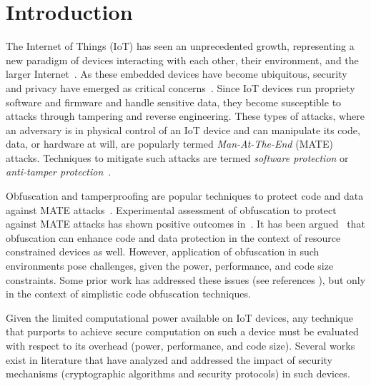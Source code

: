 \section{Introduction}
The Internet of Things (IoT) has seen an unprecedented growth, representing a new paradigm of devices interacting with each other, their environment, and the larger Internet~\cite{ATZORI20102787}. As these embedded devices have become ubiquitous, security and privacy have emerged as critical concerns~\cite{weber2010internet,7054433}. Since IoT devices run propriety software and firmware and handle sensitive data, they become susceptible to attacks through tampering and reverse engineering. These types of attacks, where an adversary is in physical control of an IoT device and can manipulate its code, data, or hardware at will, are popularly termed {\em Man-At-The-End} (MATE) attacks. Techniques to mitigate such attacks are termed {\em software protection} or {\em anti-tamper protection}~\cite{falcarin2011guest}.

Obfuscation and tamperproofing are popular techniques to protect code and data against MATE attacks~\cite{collberg_surreptitious_2010}. Experimental assessment of obfuscation to protect against MATE attacks has shown positive outcomes in~\cite{5090041,7781792}. It has been argued~\cite{Hosseinzadeh2015} that obfuscation can enhance code and data protection in the context of resource constrained devices as well. However, application of obfuscation in such environments pose challenges, given the power, performance, and code size constraints. Some prior work has addressed these issues (see references \cite{6976079,dhukovic2015load,raj2017modelling}), but only in the context of simplistic code obfuscation techniques.

Given the limited computational power available on IoT devices, any technique that purports to achieve secure computation on such a device must be evaluated with respect to its overhead (power, performance, and code size). Several works exist in literature that have analyzed and addressed the impact of security mechanisms (cryptographic algorithms and security protocols) in such devices.    

